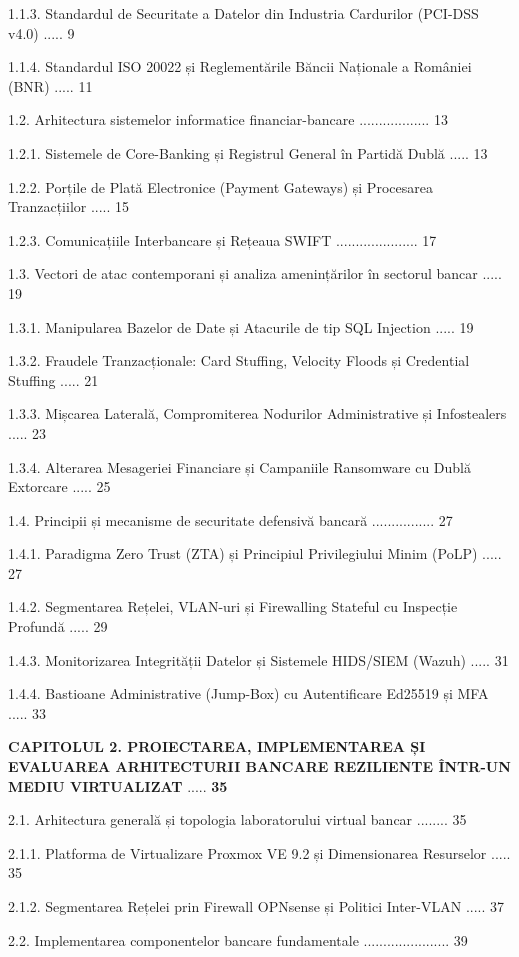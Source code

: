\documentclass[
]{article}
\begin{document}
1.1.3. Standardul de Securitate a Datelor din Industria Cardurilor
(PCI-DSS v4.0) ..... 9

1.1.4. Standardul ISO 20022 și Reglementările Băncii Naționale a
României (BNR) ..... 11

1.2. Arhitectura sistemelor informatice financiar-bancare
.................. 13

1.2.1. Sistemele de Core-Banking și Registrul General în Partidă Dublă
..... 13

1.2.2. Porțile de Plată Electronice (Payment Gateways) și Procesarea
Tranzacțiilor ..... 15

1.2.3. Comunicațiile Interbancare și Rețeaua SWIFT .....................
17

1.3. Vectori de atac contemporani și analiza amenințărilor în sectorul
bancar ..... 19

1.3.1. Manipularea Bazelor de Date și Atacurile de tip SQL Injection
..... 19

1.3.2. Fraudele Tranzacționale: Card Stuffing, Velocity Floods și
Credential Stuffing ..... 21

1.3.3. Mișcarea Laterală, Compromiterea Nodurilor Administrative și
Infostealers ..... 23

1.3.4. Alterarea Mesageriei Financiare și Campaniile Ransomware cu Dublă
Extorcare ..... 25

1.4. Principii și mecanisme de securitate defensivă bancară
................ 27

1.4.1. Paradigma Zero Trust (ZTA) și Principiul Privilegiului Minim
(PoLP) ..... 27

1.4.2. Segmentarea Rețelei, VLAN-uri și Firewalling Stateful cu
Inspecție Profundă ..... 29

1.4.3. Monitorizarea Integrității Datelor și Sistemele HIDS/SIEM (Wazuh)
..... 31

1.4.4. Bastioane Administrative (Jump-Box) cu Autentificare Ed25519 și
MFA ..... 33

\textbf{CAPITOLUL 2. PROIECTAREA, IMPLEMENTAREA ȘI EVALUAREA
ARHITECTURII BANCARE REZILIENTE ÎNTR-UN MEDIU VIRTUALIZAT} .....
\textbf{35}

2.1. Arhitectura generală și topologia laboratorului virtual bancar
........ 35

2.1.1. Platforma de Virtualizare Proxmox VE 9.2 și Dimensionarea
Resurselor ..... 35

2.1.2. Segmentarea Rețelei prin Firewall OPNsense și Politici Inter-VLAN
..... 37

2.2. Implementarea componentelor bancare fundamentale
...................... 39
\end{document}

